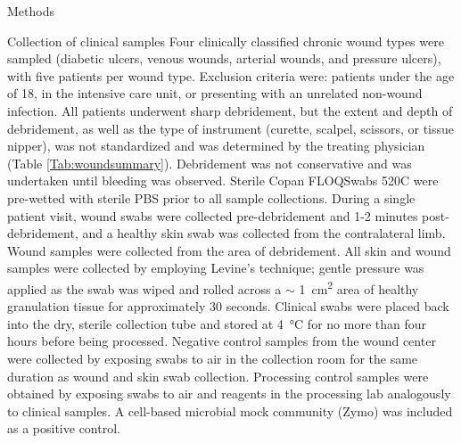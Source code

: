 \documentclass[oneside,12pt,final]{sty/ucthesis-CA2012}
\begin{document}
\begin{mainmatter}
\begin{section}{Methods}
\begin{subsection}{Collection of clinical samples}
Four clinically classified chronic wound types were sampled (diabetic ulcers, venous wounds, arterial wounds, and pressure ulcers), with five patients per wound type. Exclusion criteria were: patients under the age of 18, in the intensive care unit, or presenting with an unrelated non-wound infection. All patients underwent sharp debridement, but the extent and depth of debridement, as well as the type of instrument (curette, scalpel, scissors, or tissue nipper), was not standardized and was determined by the treating physician (Table \ref{Tab:woundsummary}). Debridement was not conservative and was undertaken until bleeding was observed. Sterile Copan FLOQSwabs 520C were pre-wetted with sterile PBS prior to all sample collections. During a single patient visit, wound swabs were collected pre-debridement and 1-2 minutes post-debridement, and a healthy skin swab was collected from the contralateral limb. Wound samples were collected from the area of debridement. All skin and wound samples were collected by employing Levine’s technique; gentle pressure was applied as the swab was wiped and rolled across a $\sim$ \SI{1}{\centi\meter\squared} area of healthy granulation tissue for approximately 30 seconds. Clinical swabs were placed back into the dry, sterile collection tube and stored at \SI{4}{\celsius} for no more than four hours before being processed. Negative control samples from the wound center were collected by exposing swabs to air in the collection room for the same duration as wound and skin swab collection. Processing control samples were obtained by exposing swabs to air and reagents in the processing lab analogously to clinical samples. A cell-based microbial mock community (Zymo) was included as a positive control.
\end{subsection}


\end{section}
\end{mainmatter}
\end{document}
